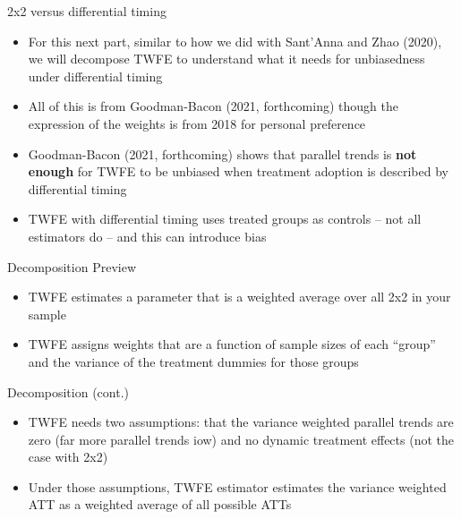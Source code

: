 \documentclass{beamer}
\begin{document}
\begin{frame}{2x2 versus differential timing}

\begin{itemize}
	\item For this next part, similar to how we did with Sant'Anna and Zhao (2020), we will decompose TWFE to understand what it needs for unbiasedness under differential timing
	\item All of this is from Goodman-Bacon (2021, forthcoming) though the expression of the weights is from 2018 for personal preference
	\item Goodman-Bacon (2021, forthcoming) shows that parallel trends is \textbf{not enough} for TWFE to be unbiased when treatment adoption is described by differential timing
	\item TWFE with differential timing uses treated groups as controls -- not all estimators do -- and this can introduce bias
\end{itemize}

\end{frame}



\begin{frame}{Decomposition Preview}

\begin{itemize}
\item TWFE estimates a parameter that is a weighted average over all 2x2 in your sample
\item TWFE assigns weights that are a function of sample sizes of each ``group'' and the variance of the treatment dummies for those groups
\end{itemize}

\end{frame}

\begin{frame}{Decomposition (cont.)}

\begin{itemize}
\item TWFE needs two assumptions: that the variance weighted parallel trends are zero (far more parallel trends iow) and no dynamic treatment effects (not the case with 2x2)
\item Under those assumptions, TWFE estimator estimates the variance weighted ATT as a weighted average of all possible ATTs
\end{itemize}

\end{frame}
\end{document}
